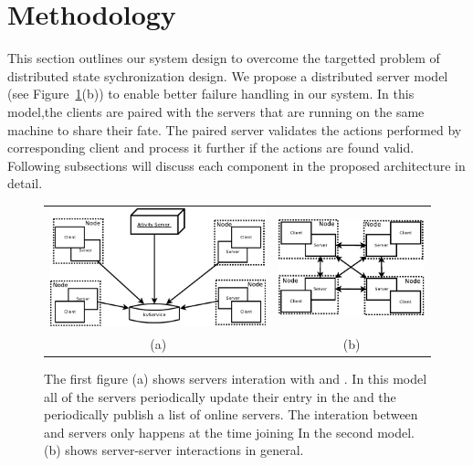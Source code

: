 
\section{Methodology}
\label{sec:methodology}

	This section outlines our system design to overcome the targetted problem of distributed state sychronization design. We propose a distributed server model (see Figure~\ref{figure:server-models}(b)) to enable better failure handling in our system. In this model,the clients are paired with the servers that are running on the same machine to share their fate. The paired server validates the actions performed by corresponding client and process it further if the actions are found valid. Following subsections will discuss each component in the proposed architecture in detail.

\begin{figure}[ht]
	\centering
	\begin{tabular}{c c}
		
		\includegraphics[width=0.52\linewidth]{../images/client-distributed-server-model-Activity-crop.pdf} &
		\includegraphics[width=0.40\linewidth]{../images/client-distributed-server-model-crop.pdf} \\
		(a) & (b)
	\end{tabular}
	
	\caption{\label{figure:server-models} The first figure (a) shows servers interation with \activityServer and \kvService. In this model all of the servers periodically update their entry in the \kvService and the \activityServer periodically publish a list of online servers. The interation between \activityServer and servers only happens at the time joining In the second model.(b) shows server-server interactions in general.}
\end{figure}



